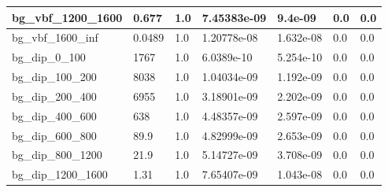 \documentclass[a4paper, 10pt]{article}
\begin{document}
\begin{table}[H]
\begin{center}
\begin{tabular}{|m{23.0mm}|m{23.0mm}|m{18.0mm}|m{19.0mm}|m{19.0mm}|m{19.0mm}|m{19.0mm}|}
      \hline
      {\cellcolor{white}         bg\_vbf\_1200\_1600}& {\cellcolor{white}         0.677}& {\cellcolor{white}         1.0}& {\cellcolor{white}         7.45383e-09}& {\cellcolor{white}         9.4e-09}& {\cellcolor{green}         0.0}& {\cellcolor{green}         0.0}\\
      \hline
      {\cellcolor{white}         bg\_vbf\_1600\_inf}& {\cellcolor{white}         0.0489}& {\cellcolor{white}         1.0}& {\cellcolor{white}         1.20778e-08}& {\cellcolor{white}         1.632e-08}& {\cellcolor{green}         0.0}& {\cellcolor{green}         0.0}\\
      \hline
      {\cellcolor{white}         bg\_dip\_0\_100}& {\cellcolor{white}         1767}& {\cellcolor{white}         1.0}& {\cellcolor{white}         6.0389e-10}& {\cellcolor{white}         5.254e-10}& {\cellcolor{green}         0.0}& {\cellcolor{green}         0.0}\\
      \hline
      {\cellcolor{white}         bg\_dip\_100\_200}& {\cellcolor{white}         8038}& {\cellcolor{white}         1.0}& {\cellcolor{white}         1.04034e-09}& {\cellcolor{white}         1.192e-09}& {\cellcolor{green}         0.0}& {\cellcolor{green}         0.0}\\
      \hline
      {\cellcolor{white}         bg\_dip\_200\_400}& {\cellcolor{white}         6955}& {\cellcolor{white}         1.0}& {\cellcolor{white}         3.18901e-09}& {\cellcolor{white}         2.202e-09}& {\cellcolor{green}         0.0}& {\cellcolor{green}         0.0}\\
      \hline
      {\cellcolor{white}         bg\_dip\_400\_600}& {\cellcolor{white}         638}& {\cellcolor{white}         1.0}& {\cellcolor{white}         4.48357e-09}& {\cellcolor{white}         2.597e-09}& {\cellcolor{green}         0.0}& {\cellcolor{green}         0.0}\\
      \hline
      {\cellcolor{white}         bg\_dip\_600\_800}& {\cellcolor{white}         89.9}& {\cellcolor{white}         1.0}& {\cellcolor{white}         4.82999e-09}& {\cellcolor{white}         2.653e-09}& {\cellcolor{green}         0.0}& {\cellcolor{green}         0.0}\\
      \hline
      {\cellcolor{white}         bg\_dip\_800\_1200}& {\cellcolor{white}         21.9}& {\cellcolor{white}         1.0}& {\cellcolor{white}         5.14727e-09}& {\cellcolor{white}         3.708e-09}& {\cellcolor{green}         0.0}& {\cellcolor{green}         0.0}\\
      \hline
      {\cellcolor{white}         bg\_dip\_1200\_1600}& {\cellcolor{white}         1.31}& {\cellcolor{white}         1.0}& {\cellcolor{white}         7.65407e-09}& {\cellcolor{white}         1.043e-08}& {\cellcolor{green}         0.0}& {\cellcolor{green}         0.0}\\

\end{tabular}
\end{center}
\end{table}
\end{document}
